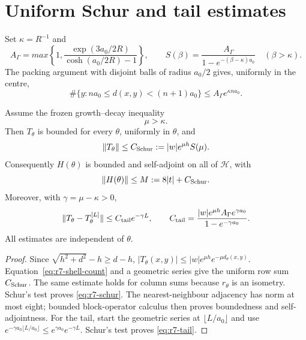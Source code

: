 \section{Uniform Schur and tail estimates}
\label{sec:r7-schur}

Set $\kappa=R^{-1}$ and
\begin{equation}
 A_\Gamma=max\left\{1,
 \frac{\exp(3a_0/2R)}{\cosh(a_0/2R)-1}\right\},\qquad
 S(\beta)=\frac{A_\Gamma}{1-e^{-(\beta-\kappa)a_0}}
 \quad(\beta>\kappa).
 \label{eq:r7-packing-constants}
\end{equation}
The packing argument with disjoint balls of radius $a_0/2$ gives, uniformly
in the centre,
\begin{equation}
 \#\{y:na_0\le d(x,y)<(n+1)a_0\}
 \le A_\Gamma e^{\kappa na_0}.
 \label{eq:r7-shell-count}
\end{equation}

\begin{theorem}
\label{thm:r7-wellposed}
Assume the frozen growth--decay inequality
\begin{equation}\mu>\kappa.\label{eq:r7-growth-decay}\end{equation}
Then $T_\theta$ is bounded for every $\theta$, uniformly in $\theta$, and
\begin{equation}
 \|T_\theta\|\le C_{\rm Schur}:=
 |w|e^{\mu h}S(\mu).
 \label{eq:r7-schur}
\end{equation}
Consequently $H(\theta)$ is bounded and self-adjoint on all of $\mathscr H$,
with
\begin{equation}\|H(\theta)\|\le M:=8|t|+C_{\rm Schur}.\end{equation}
Moreover, with $\gamma=\mu-\kappa>0$,
\begin{equation}
 \|T_\theta-T_\theta^{[L]}\|
 \le C_{\rm tail}e^{-\gamma L},\qquad
 C_{\rm tail}=
 \frac{|w|e^{\mu h}A_\Gamma e^{\gamma a_0}}
 {1-e^{-\gamma a_0}} .
 \label{eq:r7-tail}
\end{equation}
All estimates are independent of $\theta$.
\end{theorem}

\begin{proof}
Since $\sqrt{h^2+d^2}-h\ge d-h$,
$|T_\theta(x,y)|\le |w|e^{\mu h}e^{-\mu d_\theta(x,y)}$.
Equation~\eqref{eq:r7-shell-count} and a geometric series give the uniform
row sum $C_{\rm Schur}$.  The same estimate holds for column sums because
$r_\theta$ is an isometry.  Schur's test proves
\eqref{eq:r7-schur}.  The nearest-neighbour adjacency has norm at most eight;
bounded block-operator calculus then proves boundedness and self-adjointness.
For the tail, start the geometric series at
$\lfloor L/a_0\rfloor$ and use
$e^{-\gamma a_0\lfloor L/a_0\rfloor}
\le e^{\gamma a_0}e^{-\gamma L}$.  Schur's test proves
\eqref{eq:r7-tail}.
\end{proof}

